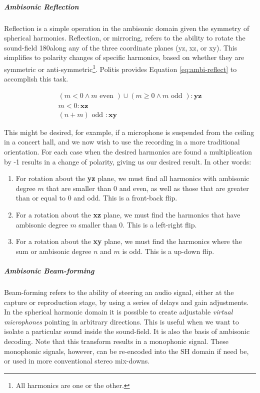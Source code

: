 \subparagraph{Ambisonic Reflection}

Reflection is a simple operation in the ambisonic domain given the symmetry of spherical harmonics. Reflection, or mirroring, refers to the ability to rotate the sound-field 180\textdegree along any of the three coordinate planes (yz, xz, or xy). This simplifies to polarity changes of specific harmonics, based on whether they are symmetric or anti-symmetric\footnote{All harmonics are one or the other.}. Politis provides Equation \ref{eq:ambi-reflect} to accomplish this task.

\begin{equation}
\begin{aligned}
(m<0 \wedge m \text { even }) \cup(m \geq 0 \wedge m \text { odd }):  \mathbf{y z}\\
m<0: \mathbf{x z}\\
(n+m) \text { odd }: \mathbf{x y} 
\end{aligned}
\label{eq:ambi-reflect}
\end{equation}

This might be desired, for example, if a microphone is suspended from the ceiling in a concert hall, and we now wish to use the recording in a more traditional orientation. For each case when the desired harmonics are found a multiplication by -1 results in a change of polarity, giving us our desired result. In other words:

\begin{enumerate}
    \item For rotation about the \textbf{yz} plane, we must find all harmonics with ambisonic degree $m$ that are smaller than 0 and even, as well as those that are greater than or equal to 0 and odd. This is a front-back flip.
    \item For a rotation about the \textbf{xz} plane, we must find the harmonics that have ambisonic degree $m$ smaller than 0.  This is a left-right flip.
    \item For a rotation about the \textbf{xy} plane, we must find the harmonics where the sum or ambisonic degree $n$ and $m$ is odd.  This is a up-down flip.
\end{enumerate}

\subparagraph{Ambisonic Beam-forming}

Beam-forming refers to the ability of steering an audio signal, either at the capture or reproduction stage, by using a series of delays and gain adjustments. In the spherical harmonic domain it is possible to create adjustable \textit{virtual microphones} pointing in arbitrary directions. This is useful when we want to isolate a particular sound inside the sound-field. It is also the basis of ambisonic decoding. Note that this transform results in a monophonic signal. These monophonic signals, however, can be re-encoded into the SH domain if need be, or used in more conventional stereo mix-downs.

